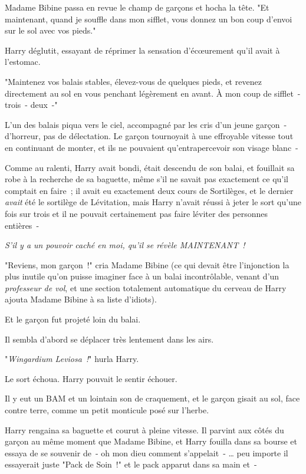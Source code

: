 Madame Bibine passa en revue le champ de garçons et hocha la tête. "Et maintenant, quand je souffle dans mon sifflet, vous donnez un bon coup d'envoi sur le sol avec vos pieds."

Harry déglutit, essayant de réprimer la sensation d'écœurement qu'il avait à l'estomac.

"Maintenez vos balais stables, élevez-vous de quelques pieds, et revenez directement au sol en vous penchant légèrement en avant. À mon coup de sifflet~- trois~- deux~-"

L'un des balais piqua vers le ciel, accompagné par les cris d'un jeune garçon~- d'horreur, pas de délectation. Le garçon tournoyait à une effroyable vitesse tout en continuant de monter, et ils ne pouvaient qu'entrapercevoir son visage blanc~-

Comme au ralenti, Harry avait bondi, était descendu de son balai, et fouillait sa robe à la recherche de sa baguette, même s'il ne savait pas exactement ce qu'il comptait en faire~; il avait eu exactement deux cours de Sortilèges, et le dernier \emph{avait} été le sortilège de Lévitation, mais Harry n'avait réussi à jeter le sort qu'une fois sur trois et il ne pouvait certainement pas faire léviter des personnes entières~-

\emph{S'il y a un pouvoir caché en moi, qu'il se révèle MAINTENANT~!}

"Reviens, mon garçon~!" cria Madame Bibine (ce qui devait être l'injonction la plus inutile qu'on puisse imaginer face à un balai incontrôlable, venant d'un \emph{professeur de vol}, et une section totalement automatique du cerveau de Harry ajouta Madame Bibine à sa liste d'idiots).

Et le garçon fut projeté loin du balai.

Il sembla d'abord se déplacer très lentement dans les airs.

"\emph{Wingardium Leviosa~!}" hurla Harry.

Le sort échoua. Harry pouvait le sentir échouer.

Il y eut un BAM et un lointain son de craquement, et le garçon gisait au sol, face contre terre, comme un petit monticule posé sur l'herbe.

Harry rengaina sa baguette et courut à pleine vitesse. Il parvint aux côtés du garçon au même moment que Madame Bibine, et Harry fouilla dans sa bourse et essaya de se souvenir de~- oh mon dieu comment s'appelait~- … peu importe il essayerait juste "Pack de Soin~!" et le pack apparut dans sa main et~-

